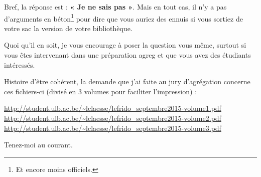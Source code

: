 Bref, la réponse est : \textbf{« Je ne sais pas »}. Mais en tout cas, il n'y a pas d'arguments en béton\footnote{Et encore moins officiels.} pour dire que vous auriez des ennuis si vous sortiez de votre sac la version de votre bibliothèque.

Quoi qu'il en soit, je vous encourage à poser la question vous même, surtout si vous êtes intervenant dans une préparation agreg et que vous avez des étudiants intéressés.

Histoire d'être cohérent, la demande que j'ai faite au jury d'agrégation concerne ces fichiers-ci (divisé en 3 volumes pour faciliter l'impression) :
\begin{center}
    \url{http://student.ulb.ac.be/~lclaesse/lefrido_septembre2015-volume1.pdf}\\
    \url{http://student.ulb.ac.be/~lclaesse/lefrido_septembre2015-volume2.pdf}\\
    \url{http://student.ulb.ac.be/~lclaesse/lefrido_septembre2015-volume3.pdf}
\end{center}

Tenez-moi au courant. 

